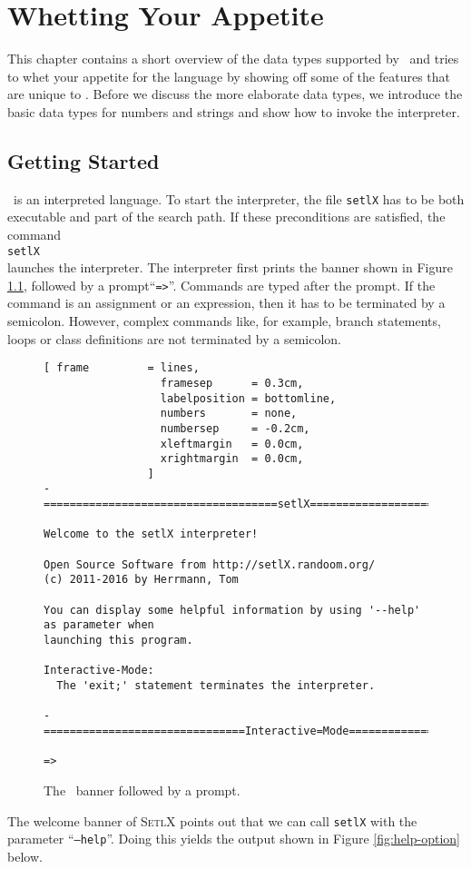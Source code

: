 \chapter{Whetting Your Appetite}
This chapter contains a short overview of the data types supported by
\setlx\ and tries to whet your appetite for the language by showing off some of
the features that are unique to \setlx.  Before we discuss the more elaborate data types,
we introduce the basic data types for numbers and strings and show how to invoke the interpreter.


\section{Getting Started}
\setlx\ is an interpreted language.  To start the interpreter,  the file
\texttt{setlX} has to be both executable and part of the search path.   If these
preconditions are satisfied, the command
\\[0.2cm]
\hspace*{1.3cm}
\texttt{setlX}
\\[0.2cm]
 launches the interpreter.  The interpreter first prints the banner shown in Figure
\ref{fig:banner}, followed by a prompt``\texttt{=>}''.  Commands are typed after the prompt.    
If the command is an assignment or an expression, then it has to be terminated by a semicolon.
However, complex commands like, for example, branch statements, loops or class definitions are not
terminated by a semicolon. 

\begin{figure}[!ht]
\centering
\begin{Verbatim}[ frame         = lines, 
                  framesep      = 0.3cm, 
                  labelposition = bottomline,
                  numbers       = none,
                  numbersep     = -0.2cm,
                  xleftmargin   = 0.0cm,
                  xrightmargin  = 0.0cm,
                ]
-====================================setlX=============================v2.5.0=-

Welcome to the setlX interpreter!

Open Source Software from http://setlX.randoom.org/
(c) 2011-2016 by Herrmann, Tom

You can display some helpful information by using '--help' as parameter when
launching this program.

Interactive-Mode:
  The 'exit;' statement terminates the interpreter.

-===============================Interactive=Mode==============================-

=> 
\end{Verbatim}
\vspace*{-0.3cm}
\caption{The \setlx\ banner followed by a prompt.}
\label{fig:banner}
\end{figure}
\noindent
The welcome banner of \textsc{SetlX} points out that we can call \texttt{setlX} with the parameter 
``\texttt{--help}''.   Doing this yields the output shown in Figure \ref{fig:help-option} below. 

